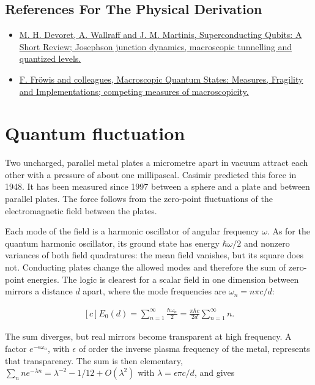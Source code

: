 \documentclass[11pt,oneside]{book}
\newenvironment{centeredalign}{\[\begin{gathered}[c]}{\end{gathered}\]}
\begin{document}
\subsection*{References For The Physical Derivation}
\begin{itemize}
\item \href{https://arxiv.org/abs/cond-mat/0411174}{M. H. Devoret, A. Wallraff and J. M. Martinis, Superconducting Qubits: A Short Review; Josephson junction dynamics, macroscopic tunnelling and quantized levels.}
\item \href{https://arxiv.org/abs/1706.06173}{F. Fröwis and colleagues, Macroscopic Quantum States: Measures, Fragility and Implementations; competing measures of macroscopicity.}
\end{itemize}





\clearpage

\section{Quantum fluctuation}

\label{topic:quantum-fluctuation}

Two uncharged, parallel metal plates a micrometre apart in vacuum attract each other with a pressure of about one millipascal. Casimir predicted this force in 1948. It has been measured since 1997 between a sphere and a plate and between parallel plates. The force follows from the zero-point fluctuations of the electromagnetic field between the plates.

Each mode of the field is a harmonic oscillator of angular frequency \(\omega\). As for the quantum harmonic oscillator, its ground state has energy \(\hbar\omega/2\) and nonzero variances of both field quadratures: the mean field vanishes, but its square does not. Conducting plates change the allowed modes and therefore the sum of zero-point energies. The logic is clearest for a scalar field in one dimension between mirrors a distance \(d\) apart, where the mode frequencies are \(\omega_n=n\pi c/d\):

\begin{centeredalign}
E_0(d)=\sum_{n=1}^\infty\frac{\hbar\omega_n}{2}=\frac{\pi\hbar c}{2d}\sum_{n=1}^\infty n.
\end{centeredalign}

The sum diverges, but real mirrors become transparent at high frequency. A factor \(e^{-\epsilon\omega_n}\), with \(\epsilon\) of order the inverse plasma frequency of the metal, represents that transparency. The sum is then elementary, \(\sum_nne^{-\lambda n}=\lambda^{-2}-1/12+O(\lambda^2)\) with \(\lambda=\epsilon\pi c/d\), and gives
\end{document}
